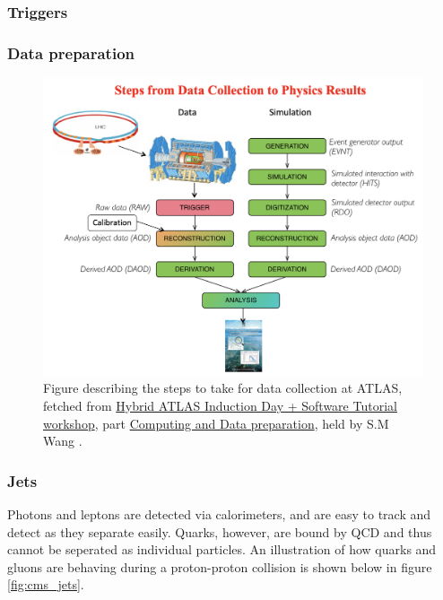 \subsubsection*{Triggers}


\subsubsection*{Data preparation}


\begin{figure}[h!]
    \includegraphics[width=\linewidth]{Figures/atlas/data_col_phys.png}
    \caption{Figure describing the steps to take for data collection at ATLAS, fetched from \href{https://indico.cern.ch/event/1159574/timetable/?view=standard}{Hybrid ATLAS Induction Day + Software Tutorial workshop}, part
    \href{https://indico.cern.ch/event/860971/contributions/3672974/attachments/1972049/3280896/Atlas_computing_data_preparation_jan20.pdf}{Computing and Data preparation}, 
    held by S.M Wang \cite{Wang:2707056} . }
    \label{fig:atlas_data_col_phys}
\end{figure}


\subsubsection*{Jets}
Photons and leptons are detected via calorimeters, and are easy to track and detect as they separate easily. Quarks, however, are bound by QCD and thus cannot be seperated as individual particles. 
An illustration of how quarks and gluons are behaving during a proton-proton collision is shown below in figure \ref{fig:cms_jets}.

